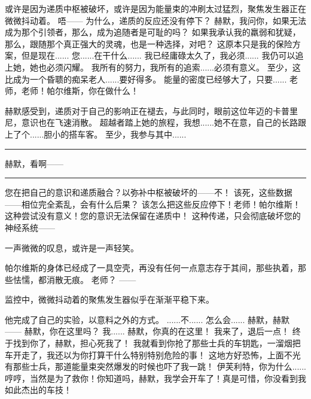 \documentclass[openany]{book}
\begin{document}
\begin{dialogue}
    或许是因为递质中枢被破坏，或许是因为能量束的冲刷太过猛烈，聚焦发生器正在微微抖动着。
     唔——
     为什么，递质的反应还没有停下？
     赫默，我问你，如果无法成为那个引领者，那么，成为追随者是可耻的吗？
     如果我承认我的羸弱和犹疑，那么，跟随那个真正强大的灵魂，也是一种选择，对吧？
     这原本只是我的保险方案，但是现在......
     您......在干什么......
     我已经庸碌太久了，我必须......
     我仍可以追上她，她也必须闪耀。
     我所有的努力，我所有的追索......必须有意义。
     至少，这比成为一个昏聩的痴呆老人......要好得多。
     能量的密度已经够大了，只要......
     老师，老师！帕尔维斯，你在做什么！\par
    赫默感受到，递质对于自己的影响正在褪去，与此同时，眼前这位年迈的卡普里尼，意识也在飞速消散。
     超越者踏上她的旅程，我想......她不在意，自己的长路跟上了个......胆小的搭车客。
     至少，我参与其中......
    \par\noindent\rule{\textwidth}{0.4pt}
     赫默，看啊——
    \par\noindent\rule{\textwidth}{0.4pt}
     您在把自己的意识和递质融合？以弥补中枢被破坏的——不！
     该死，这些数据——相位完全紊乱，会有什么后果？
     该怎么把这些反应停下！老师！帕尔维斯！
     这种尝试没有意义！您的意识无法保留在递质中！
     这种传递，只会彻底破坏您的神经系统——\par
    一声微微的叹息，或许是一声轻笑。\par
    帕尔维斯的身体已经成了一具空壳，再没有任何一点意志存于其间，那些执着，那些怯懦，都消散无痕。
     老师？
     ——\par
    监控中，微微抖动着的聚焦发生器似乎在渐渐平稳下来。\par
    他完成了自己的实验，以意料之外的方式。
     ......不......
     怎么会......
     赫默，赫默——
     赫默，你在这里吗？
     我......
     赫默，你真的在这里！
     我来了，退后一点！
     终于找到你了，赫默，担心死我了！
     我就看到你抢了那些士兵的车钥匙，一溜烟把车开走了，我还以为你打算干什么特别特别危险的事！
     这地方好恐怖，上面不光有那些士兵，那道能量束突然爆发的时候也吓了我一跳！
     伊芙利特，你为什么......
     哼哼，当然是为了救你！你知道吗，赫默，我学会开车了！真是可惜，你没看到我如此杰出的车技！

\end{dialogue}
\end{document}
